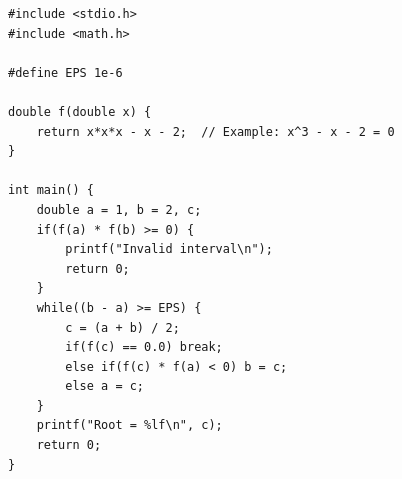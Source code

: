 \begin{verbatim}
#include <stdio.h>
#include <math.h>

#define EPS 1e-6

double f(double x) {
    return x*x*x - x - 2;  // Example: x^3 - x - 2 = 0
}

int main() {
    double a = 1, b = 2, c;
    if(f(a) * f(b) >= 0) {
        printf("Invalid interval\n");
        return 0;
    }
    while((b - a) >= EPS) {
        c = (a + b) / 2;
        if(f(c) == 0.0) break;
        else if(f(c) * f(a) < 0) b = c;
        else a = c;
    }
    printf("Root = %lf\n", c);
    return 0;
}

\end{verbatim}